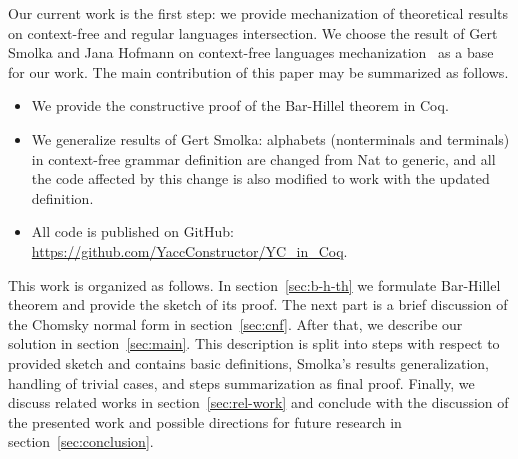 Our current work is the first step: we provide mechanization of theoretical results on context-free and regular languages intersection.
We choose the result of Gert Smolka and Jana Hofmann on context-free languages mechanization~\cite{smolkaHofmann2016} as a base for our work.
The main contribution of this paper may be summarized as follows.
\begin{itemize}
\item We provide the constructive proof of the Bar-Hillel theorem in Coq.
\item We generalize results of Gert Smolka: alphabets (nonterminals and terminals) in context-free grammar definition are changed from Nat to generic, and all the code affected by this change is also modified to work with the updated definition.
\item All code is published on GitHub: \url{https://github.com/YaccConstructor/YC_in_Coq}.
\end{itemize}

This work is organized as follows.
In section~\ref{sec:b-h-th} we formulate Bar-Hillel theorem and provide the sketch of its proof.
The next part is a brief discussion of the Chomsky normal form in section~\ref{sec:cnf}.
After that, we describe our solution in section~\ref{sec:main}.
This description is split into steps with respect to provided sketch and contains basic definitions, Smolka's results generalization, handling of trivial cases, and steps summarization as final proof.
Finally, we discuss related works in section~\ref{sec:rel-work} and conclude with the discussion of the presented work and possible directions for future research in section~\ref{sec:conclusion}.

